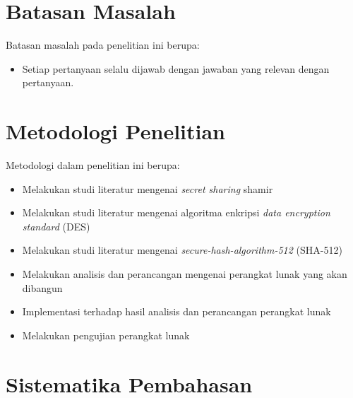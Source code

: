 \section{\textbf{Batasan Masalah}}
\label{sec:batasan masalah}

Batasan masalah pada penelitian ini berupa:
\begin{itemize}
	\item Setiap pertanyaan selalu dijawab dengan jawaban yang relevan dengan pertanyaan.
\end{itemize}

\section{\textbf{Metodologi Penelitian}}
\label{sec:metodologi penelitian}

Metodologi dalam penelitian ini berupa:
\begin{itemize}
	\item Melakukan studi literatur mengenai {\it secret sharing} shamir
	\item Melakukan studi literatur mengenai algoritma enkripsi \textit{data encryption standard} (DES)
	\item Melakukan studi literatur mengenai \textit{secure-hash-algorithm-512} (SHA-512)
	\item Melakukan analisis dan perancangan mengenai perangkat lunak yang akan dibangun
	\item Implementasi terhadap hasil analisis dan perancangan perangkat lunak
	\item Melakukan pengujian perangkat lunak
\end{itemize}

\section{\textbf{Sistematika Pembahasan}}
\label{sec:sistematika pembahasan}

